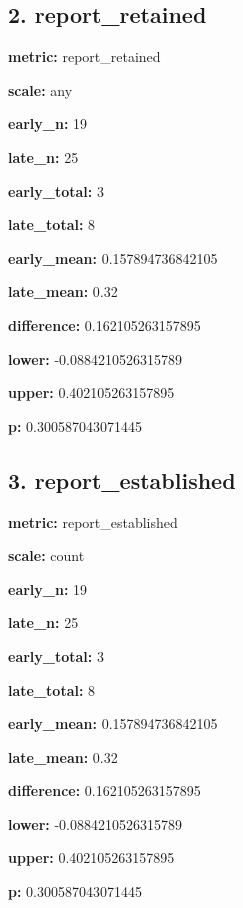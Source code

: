 \documentclass[10pt,a4paper]{article}
\begin{document}
\subsection*{2.\allowbreak{} report\_\allowbreak{}retained}
\textbf{metric:} report\_\allowbreak{}retained\par
\textbf{scale:} any\par
\textbf{early\_\allowbreak{}n:} 19\par
\textbf{late\_\allowbreak{}n:} 25\par
\textbf{early\_\allowbreak{}total:} 3\par
\textbf{late\_\allowbreak{}total:} 8\par
\textbf{early\_\allowbreak{}mean:} 0.\allowbreak{}157894736842105\par
\textbf{late\_\allowbreak{}mean:} 0.\allowbreak{}32\par
\textbf{difference:} 0.\allowbreak{}162105263157895\par
\textbf{lower:} -\allowbreak{}0.\allowbreak{}0884210526315789\par
\textbf{upper:} 0.\allowbreak{}402105263157895\par
\textbf{p:} 0.\allowbreak{}300587043071445\par
\subsection*{3.\allowbreak{} report\_\allowbreak{}established}
\textbf{metric:} report\_\allowbreak{}established\par
\textbf{scale:} count\par
\textbf{early\_\allowbreak{}n:} 19\par
\textbf{late\_\allowbreak{}n:} 25\par
\textbf{early\_\allowbreak{}total:} 3\par
\textbf{late\_\allowbreak{}total:} 8\par
\textbf{early\_\allowbreak{}mean:} 0.\allowbreak{}157894736842105\par
\textbf{late\_\allowbreak{}mean:} 0.\allowbreak{}32\par
\textbf{difference:} 0.\allowbreak{}162105263157895\par
\textbf{lower:} -\allowbreak{}0.\allowbreak{}0884210526315789\par
\textbf{upper:} 0.\allowbreak{}402105263157895\par
\textbf{p:} 0.\allowbreak{}300587043071445\par
\end{document}
